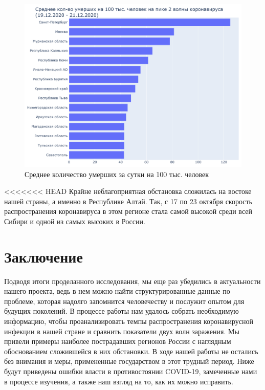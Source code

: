 \documentclass[a4paper, 12pt]{extarticle}
\begin{document}
\begin{figure}[h]
    \centering
    \includegraphics[scale=0.6]{../plots/6total_deaths_per_100k_bar_plot_2wave.pdf}
    \caption{Среднее количество умерших за сутки на 100 тыс. человек}
    \label{fig:average_deaths_per_100k_2wave}
\end{figure}

<<<<<<< HEAD
Крайне неблагоприятная обстановка сложилась на востоке нашей страны, а именно в
Республике Алтай. Так, с 17 по 23 октября скорость распространения коронавируса
в этом регионе стала самой высокой среди всей Сибири и одной из самых высоких в
России.

\clearpage
\newpage

\section{Заключение}
Подводя итоги проделанного исследования, мы еще раз убедились в актуальности
нашего проекта, ведь в нем можно найти структурированные данные по проблеме,
которая надолго запомнится человечеству и послужит опытом для будущих
поколений.
В процессе работы нам удалось собрать необходимую
информацию, чтобы проанализировать темпы распространения коронавирусной
инфекции в нашей стране и сравнить показатели двух волн заражения. Мы привели
примеры наиболее пострадавших регионов России с наглядным обоснованием
сложившейся в них обстановки.
В ходе нашей работы не остались без внимания и меры, примененные
государством в этот трудный период. Ниже будут приведены ошибки власти в
противостоянии COVID-19, замеченные нами в процессе изучения, а также наш
взгляд на то, как их можно исправить.
\\
\end{document}

